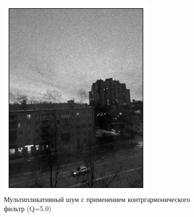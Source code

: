 \documentclass[a4paper,12pt]{article}
\begin{document}
\begin{figure}[H]
    \begin{minipage}{0.49\textwidth}
        \centering \includegraphics[width=\textwidth]{results/lpf_speckle_4.png}
        \caption{Мультипликативный шум с применением контргармонического фильтр (Q=5.0)}
    \end{minipage}
\end{figure}
\end{document}
